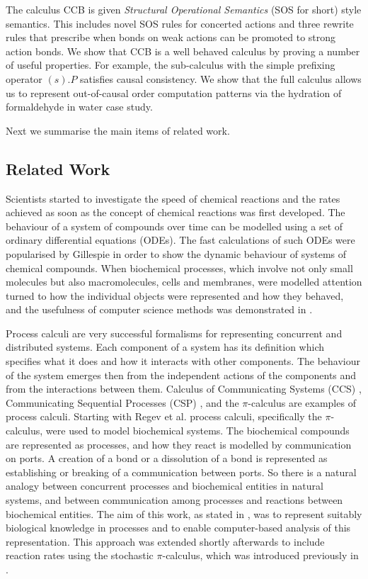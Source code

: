 The calculus CCB is given \emph{Structural Operational Semantics} (SOS for short)
style semantics. This includes
novel SOS rules for concerted actions and three rewrite rules that prescribe when bonds on weak actions 
can be promoted to strong action bonds. We show that CCB is a well behaved calculus by proving
a number of useful properties. For example, the sub-calculus with the simple prefixing operator
$(s).P$ satisfies causal consistency. We show that the full calculus allows us to represent 
out-of-causal order computation patterns via the hydration of formaldehyde in water case study. 

Next we summarise the main items of related work.

\subsection{Related Work}

Scientists started to investigate the speed of chemical reactions and the rates achieved as soon as 
the concept of chemical reactions was first developed. The behaviour of a system of compounds over 
time can be modelled using a set of ordinary differential equations (ODEs). The fast calculations 
of such ODEs were popularised by Gillespie \cite{Gillespie} in order to show the dynamic behaviour 
of systems of chemical compounds. When biochemical processes, which involve not only small molecules 
but also macromolecules, cells and membranes, were modelled attention turned to how
the individual objects were represented and how they behaved, and the usefulness of computer 
science methods was demonstrated in \cite{fontana}.

Process calculi are very successful formalisms for representing concurrent and distributed
systems. Each component of a system has its definition which specifies what it does and how it 
interacts with other components. The behaviour of the system emerges then from the independent
actions of the components and from the interactions between them.
Calculus of Communicating Systems (CCS) \cite{Milner1980}, Communicating Sequential Processes (CSP) 
\cite{HoareBook}, and the $\pi$-calculus \cite{MilnerPi} are examples of process calculi.
Starting with Regev et al. \cite{regev2001a,regev2001b,regev2004} process calculi, specifically 
the $\pi$-calculus, were used to model biochemical systems. The biochemical compounds  
are represented as processes, and how they react is modelled by communication on ports. A creation
of a bond or a dissolution of a bond is represented as establishing or breaking of a communication
between ports. 
So there is a natural analogy between concurrent processes and biochemical entities in natural 
systems, and between communication among processes and reactions between biochemical entities.
The aim of this work, as stated in \cite{regev2001b}, was to represent suitably biological knowledge in 
processes and to enable computer-based analysis of this representation. This approach was extended
shortly afterwards to include reaction rates \cite{PriameRegev} using the stochastic $\pi$-calculus, 
which was introduced previously in \cite{PriamiStochasticPi}.


